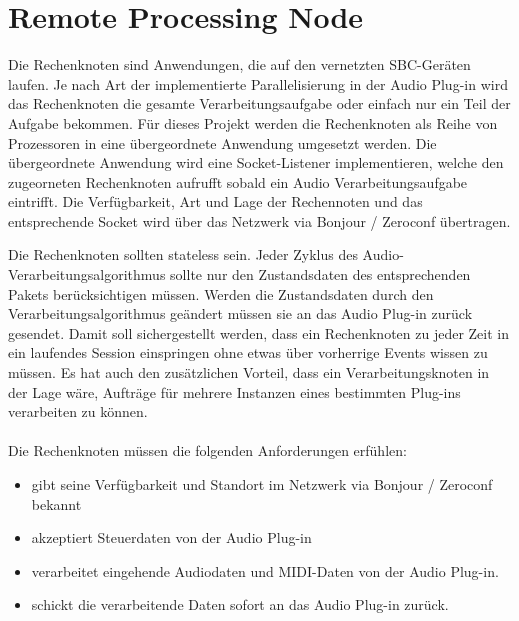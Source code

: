 \section{Remote Processing Node}

Die Rechenknoten sind Anwendungen, die auf den vernetzten SBC-Geräten laufen. Je nach Art der implementierte Parallelisierung in der Audio Plug-in wird das Rechenknoten die gesamte Verarbeitungsaufgabe oder einfach nur ein Teil der Aufgabe bekommen. Für dieses Projekt werden die Rechenknoten als Reihe von Prozessoren in eine übergeordnete Anwendung umgesetzt werden. Die übergeordnete Anwendung wird eine Socket-Listener implementieren, welche den zugeorneten Rechenknoten aufrufft sobald ein Audio Verarbeitungsaufgabe eintrifft. Die Verfügbarkeit, Art und Lage der Rechennoten und das entsprechende Socket wird über das Netzwerk via Bonjour / Zeroconf übertragen.

Die Rechenknoten sollten stateless sein. Jeder Zyklus des Audio-Verarbeitungsalgorithmus sollte nur den Zustandsdaten des entsprechenden Pakets berücksichtigen müssen. Werden die Zustandsdaten durch den Verarbeitungsalgorithmus geändert müssen sie an das Audio Plug-in zurück gesendet. Damit soll sichergestellt werden, dass ein Rechenknoten zu jeder Zeit in ein laufendes Session einspringen ohne etwas über vorherrige Events wissen zu müssen. Es hat auch den zusätzlichen Vorteil, dass ein Verarbeitungsknoten in der Lage wäre, Aufträge für mehrere Instanzen eines bestimmten Plug-ins verarbeiten zu können.\\
\\
\noindent
Die Rechenknoten müssen die folgenden Anforderungen erfühlen:

\begin{itemize}

\item gibt seine Verfügbarkeit und Standort im Netzwerk via Bonjour / Zeroconf bekannt
\item akzeptiert Steuerdaten von der Audio Plug-in
\item verarbeitet eingehende Audiodaten und MIDI-Daten von der Audio Plug-in.
\item schickt die verarbeitende Daten sofort an das Audio Plug-in zurück.

\end{itemize}
